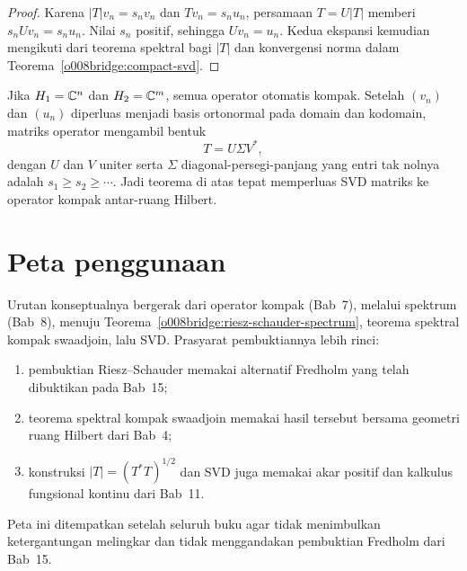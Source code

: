 \begin{proof}
Karena $|T|v_n=s_nv_n$ dan $Tv_n=s_nu_n$, persamaan
$T=U|T|$ memberi $s_nUv_n=s_nu_n$. Nilai $s_n$ positif, sehingga
$Uv_n=u_n$. Kedua ekspansi kemudian mengikuti dari teorema spektral bagi
$|T|$ dan konvergensi norma dalam
Teorema~\ref{o008bridge:compact-svd}.
\end{proof}

\begin{exam}
Jika $H_1=\mathbb{C}^n$ dan $H_2=\mathbb{C}^m$, semua operator otomatis kompak. Setelah
$(v_n)$ dan $(u_n)$ diperluas menjadi basis ortonormal pada domain dan
kodomain, matriks operator mengambil bentuk
\[
  T=U\Sigma V^*,
\]
dengan $U$ dan $V$ uniter serta $\Sigma$ diagonal-persegi-panjang yang entri
tak nolnya adalah $s_1\geq s_2\geq\cdots$. Jadi teorema di atas tepat
memperluas SVD matriks ke operator kompak antar-ruang Hilbert.
\end{exam}

\section{Peta penggunaan}

Urutan konseptualnya bergerak dari operator kompak (Bab~7), melalui spektrum
(Bab~8), menuju Teorema~\ref{o008bridge:riesz-schauder-spectrum}, teorema
spektral kompak swaadjoin, lalu SVD. Prasyarat pembuktiannya lebih rinci:
\begin{enumerate}[label=\rm{(\alph*)}]
  \item pembuktian Riesz--Schauder memakai alternatif Fredholm yang telah
        dibuktikan pada Bab~15;
  \item teorema spektral kompak swaadjoin memakai hasil tersebut bersama
        geometri ruang Hilbert dari Bab~4;
  \item konstruksi $|T|=(T^*T)^{1/2}$ dan SVD juga memakai akar positif dan
        kalkulus fungsional kontinu dari Bab~11.
\end{enumerate}
Peta ini ditempatkan setelah seluruh buku agar tidak menimbulkan ketergantungan
melingkar dan tidak menggandakan pembuktian Fredholm dari Bab~15.
